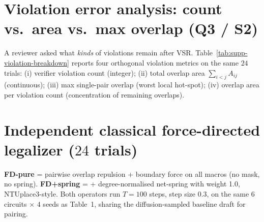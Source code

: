 \documentclass{article}
\begin{document}
\section{Violation error analysis: count vs.\ area vs.\ max overlap (Q3 / S2)}
\label{sec:supp-violation-breakdown}

A reviewer asked what \emph{kinds} of violations remain after VSR.
Table~\ref{tab:supp-violation-breakdown} reports four orthogonal
violation metrics on the same $24$ trials: (i) verifier violation count
(integer); (ii) total overlap area
$\sum_{i<j} A_{ij}$ (continuous); (iii) max single-pair overlap (worst
local hot-spot); (iv) overlap area per violation count (concentration
of remaining overlaps).

\begin{table}[h]
\centering
\small

\caption{Cross-circuit medians.  At $\lambda{=}2$ VSR halves both the
count and the total overlap area; the max single-pair drops modestly
($431\to 293$).  At $\lambda{=}8$ count and area are unchanged within
noise (the $\lambda$ knob trades macros-only HPWL, not legality magnitude
\S\ref{sec:downstream_pipeline}).  The remaining $\sim 18$k violations
are not concentrated in a few hot-spots: area-per-count drops only
$3.82\to 3.13$ ($-18\%$), so VSR removes both \emph{many tiny} overlaps
and many average-sized overlaps in roughly equal proportion.  This
matches the spatial pattern: violators are still spread across the
canvas (bbox ratio $\geq 1$), so the residual is structural and not
fixable by more aggressive local repair.}
\label{tab:supp-violation-breakdown}
\end{table}

\section{Independent classical force-directed legalizer ($24$ trials)}
\label{sec:supp-classical}

\textbf{FD-pure} = pairwise overlap repulsion + boundary force on all
macros (no mask, no spring).  \textbf{FD+spring} = + degree-normalised
net-spring with weight 1.0, NTUplace3-style.  Both operators run
$T{=}100$ steps, step size $0.3$, on the same $6$ circuits $\times$ $4$
seeds as Table~1, sharing the diffusion-sampled baseline draft for
pairing.

\begin{table}[h]
\centering
\small

\caption{Classical force-directed legalizer on the full $24$ trials
($6$ circuits $\times$ $4$ seeds, R4/Q5).  Cross-circuit medians:
FD-pure $\Delta v{=}{-}54\%/\Delta h{=}{+}144\%$;
FD+spring $\Delta v{=}{-}52\%/\Delta h{=}{+}34\%$; VSR-post($\lambda{=}8$)
$\Delta v{=}{-}52\%/\Delta h{=}{-}34\%$.  Comparable legality cut,
$\sim 70$pp better HPWL.}
\label{tab:supp-classical-24}
\end{table}
\end{document}
